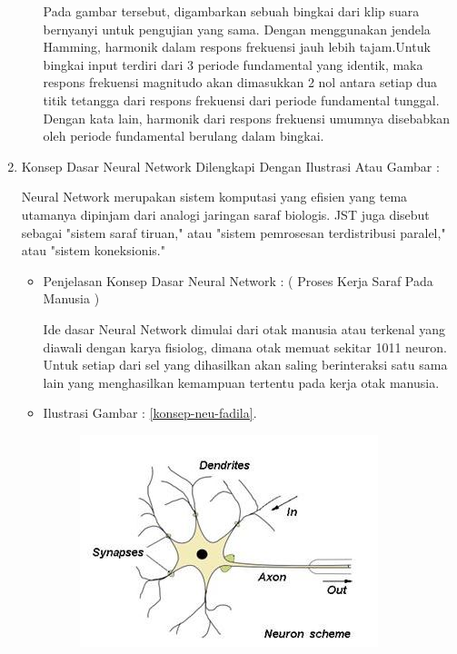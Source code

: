 \begin{enumerate}
\begin{itemize}
\par Pada gambar tersebut, digambarkan sebuah bingkai dari klip suara bernyanyi untuk pengujian yang sama. Dengan menggunakan jendela Hamming, harmonik dalam respons frekuensi jauh lebih tajam.Untuk bingkai input terdiri dari 3 periode fundamental yang identik, maka respons frekuensi magnitudo akan dimasukkan 2 nol antara setiap dua titik tetangga dari respons frekuensi dari periode fundamental tunggal. Dengan kata lain, harmonik dari respons frekuensi umumnya disebabkan oleh periode fundamental berulang dalam bingkai. 
\par
\par
\end{itemize}
\par
\par
\item Konsep Dasar Neural Network Dilengkapi Dengan Ilustrasi Atau Gambar :
\par Neural Network merupakan sistem komputasi yang efisien yang tema utamanya dipinjam dari analogi jaringan saraf biologis. JST juga disebut sebagai "sistem saraf tiruan," atau "sistem pemrosesan terdistribusi paralel," atau "sistem koneksionis."
\begin{itemize}
\item Penjelasan Konsep Dasar Neural Network : ( Proses Kerja Saraf Pada Manusia )
\par Ide dasar Neural Network dimulai dari otak manusia atau terkenal yang diawali dengan karya fisiolog, dimana otak memuat sekitar 1011 neuron. Untuk setiap dari sel yang dihasilkan akan saling berinteraksi satu sama lain yang menghasilkan kemampuan tertentu pada kerja otak manusia.
\par
\item Ilustrasi Gambar : \ref{konsep-neu-fadila}.
\par
\begin{figure}[!hbtp]
\centering
\includegraphics[scale=0.2]{figures/konsep-neu-net-fadila.jpg}

\end{figure}
\end{itemize}
\end{enumerate}
